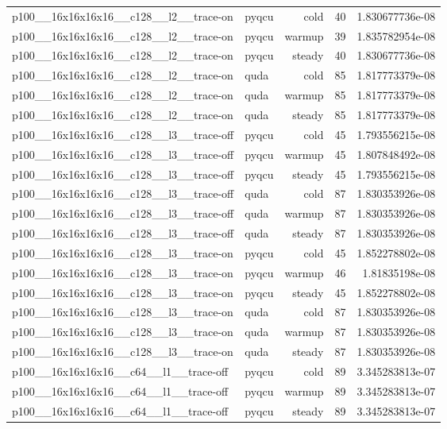 \begin{table}[htbp]
\begin{tabular}{@{}llrrr@{}}
p100\_\_16x16x16x16\_\_c128\_\_l2\_\_trace-on & pyqcu & cold & 40 & 1.830677736e-08 \\
p100\_\_16x16x16x16\_\_c128\_\_l2\_\_trace-on & pyqcu & warmup & 39 & 1.835782954e-08 \\
p100\_\_16x16x16x16\_\_c128\_\_l2\_\_trace-on & pyqcu & steady & 40 & 1.830677736e-08 \\
p100\_\_16x16x16x16\_\_c128\_\_l2\_\_trace-on & quda & cold & 85 & 1.817773379e-08 \\
p100\_\_16x16x16x16\_\_c128\_\_l2\_\_trace-on & quda & warmup & 85 & 1.817773379e-08 \\
p100\_\_16x16x16x16\_\_c128\_\_l2\_\_trace-on & quda & steady & 85 & 1.817773379e-08 \\
p100\_\_16x16x16x16\_\_c128\_\_l3\_\_trace-off & pyqcu & cold & 45 & 1.793556215e-08 \\
p100\_\_16x16x16x16\_\_c128\_\_l3\_\_trace-off & pyqcu & warmup & 45 & 1.807848492e-08 \\
p100\_\_16x16x16x16\_\_c128\_\_l3\_\_trace-off & pyqcu & steady & 45 & 1.793556215e-08 \\
p100\_\_16x16x16x16\_\_c128\_\_l3\_\_trace-off & quda & cold & 87 & 1.830353926e-08 \\
p100\_\_16x16x16x16\_\_c128\_\_l3\_\_trace-off & quda & warmup & 87 & 1.830353926e-08 \\
p100\_\_16x16x16x16\_\_c128\_\_l3\_\_trace-off & quda & steady & 87 & 1.830353926e-08 \\
p100\_\_16x16x16x16\_\_c128\_\_l3\_\_trace-on & pyqcu & cold & 45 & 1.852278802e-08 \\
p100\_\_16x16x16x16\_\_c128\_\_l3\_\_trace-on & pyqcu & warmup & 46 & 1.81835198e-08 \\
p100\_\_16x16x16x16\_\_c128\_\_l3\_\_trace-on & pyqcu & steady & 45 & 1.852278802e-08 \\
p100\_\_16x16x16x16\_\_c128\_\_l3\_\_trace-on & quda & cold & 87 & 1.830353926e-08 \\
p100\_\_16x16x16x16\_\_c128\_\_l3\_\_trace-on & quda & warmup & 87 & 1.830353926e-08 \\
p100\_\_16x16x16x16\_\_c128\_\_l3\_\_trace-on & quda & steady & 87 & 1.830353926e-08 \\
p100\_\_16x16x16x16\_\_c64\_\_l1\_\_trace-off & pyqcu & cold & 89 & 3.345283813e-07 \\
p100\_\_16x16x16x16\_\_c64\_\_l1\_\_trace-off & pyqcu & warmup & 89 & 3.345283813e-07 \\
p100\_\_16x16x16x16\_\_c64\_\_l1\_\_trace-off & pyqcu & steady & 89 & 3.345283813e-07 \\

\end{tabular}
\end{table}
